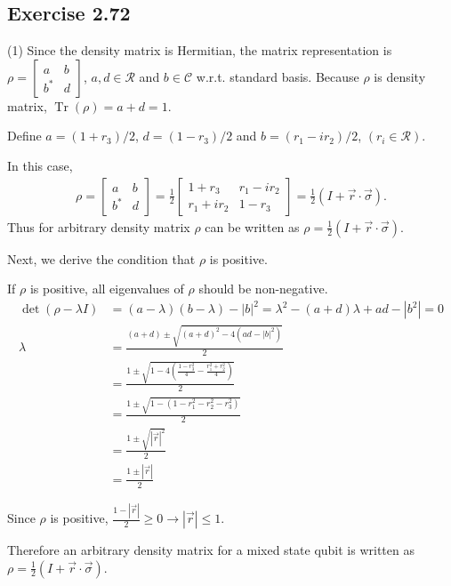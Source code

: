 \documentclass[a4paper,12pt]{article}
\DeclareMathOperator{\Tr}{Tr}
\begin{document}
\subsection*{Exercise 2.72}
(1) Since the density matrix is Hermitian, the matrix representation is
$\rho = \begin{bmatrix}
    a & b \\ b^* & d
\end{bmatrix}$,
$a, d \in \mathcal{R}$ and $b \in \mathcal{C}$ w.r.t. standard basis.
Because $\rho$ is density matrix, $\Tr (\rho) = a+d = 1$.

Define $a = (1+r_3)/2$, $d = (1-r_3)/2$ and $b = (r_1 - ir_2)/2$, $(r_i \in \mathcal{R})$.

In this case,
\begin{align*}
    \rho = \begin{bmatrix}
        a & b \\ b^* & d
    \end{bmatrix}
    =
    \frac{1}{2} \begin{bmatrix}
        1+r_3 & r_1 - ir_2 \\
        r_1 + ir_2 & 1 - r_3
    \end{bmatrix}
    =
    \frac{1}{2} (I + \vec{r} \cdot \vec{\sigma}).
\end{align*}
Thus for arbitrary density matrix $\rho$ can be written as $\rho = \frac{1}{2} (I + \vec{r} \cdot \vec{\sigma})$.

Next, we derive the condition that $\rho$ is positive.

If $\rho$ is positive, all eigenvalues of $\rho$ should be non-negative.
\begin{align*}
    \det (\rho - \lambda I) &= (a-  \lambda) (b - \lambda) - |b|^2 = \lambda^2 - (a+d)\lambda + ad - |b^2| = 0\\
    \lambda &= \frac{(a+d) \pm \sqrt{(a+d)^2 - 4 (ad - |b|^2)}}{2}\\
        &= \frac{1 \pm \sqrt{1 - 4 \left(\frac{1 - r_3^2}{4} - \frac{r_1^2 + r_2^2}{4} \right)}}{2}\\
        &= \frac{1 \pm \sqrt{1 - (1 - r_1^2 - r_2^2 - r_3^2)}}{2}\\
        &= \frac{1 \pm \sqrt{|\vec{r}|^2}}{2}\\
        &= \frac{1 \pm |\vec{r}|}{2}
\end{align*}

Since $\rho$ is positive, $\frac{1 - |\vec{r}|}{2} \geq 0 \rightarrow |\vec{r}| \leq 1$.

Therefore an arbitrary density matrix for a mixed state qubit is written as $\rho = \frac{1}{2} (I + \vec{r} \cdot \vec{\sigma})$.
\end{document}
